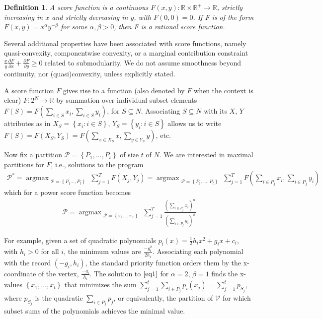 \documentclass{article}
\newtheorem{definition}{Definition}
\theoremstyle{case}
\DeclareMathOperator*{\argmax}{argmax} %
\begin{document}
\begin{definition}
A score function is a continuous $F(x, y)\colon \mathbb{R} \times \mathbb{R}^{+} \to \mathbb{R}$, strictly increasing in $x$ and strictly decreasing in $y$, with $F\left( 0,0\right) = 0$. If F is of the form $F(x,y) = x^\alpha y^{-\beta}$ for some $\alpha, \beta > 0$, then F is a rational score function. 
\end{definition}

Several additional properties have been associated with score functions, namely quasi-convexity, componentwise convexity, or a marginal contribution constraint $\frac{x}{y} \frac{\partial F}{\partial x} + \frac{\partial F}{\partial y} \geq 0$ related to submodularity. We do not assume smoothness beyond continuity, nor (quasi)convexity, unless explicitly stated.

A score function $F$ gives rise to a function (also denoted by $F$ when the context is clear) $F \colon 2^N \rightarrow \mathbb{R}$ by summation over individual subset elements $F(S) = F(\sum_{i \in S} x_i, \sum_{i \in S} y_i)$, for $S \subseteq N$. Associating $S \subseteq N$ with its $X$, $Y$ attributes as in $X_S = \left\lbrace x_i \colon i \in S\right\rbrace$, $Y_S = \left\lbrace y_i \colon i \in S\right\rbrace$ allows us to write $F(S) = F(X_S, Y_S) = F(\sum_{x \in X_S}x, \sum_{y \in Y_S}y)$, etc.

Now fix a partition $\mathcal{P} = \left\lbrace P_1, \dots, P_t\right\rbrace$ of size $t$ of $N$. We are interested in maximal partitions for $F$, i.e., solutions to the program
\begin{align} \label{eq0}
\mathcal{P}^{*} = \argmax_{\substack{\mathcal{P} = \left\lbrace P_1 \dots, P_t\right\rbrace}} {\sum\limits_{j=1}^{T}F\left( X_j, Y_j\right)} = \argmax_{\substack{\mathcal{P} = \left\lbrace P_1, \dots, P_t\right\rbrace}} {\sum\limits_{j=1}^{T}F( \sum_{i \in P_j}x_i, \sum_{i \in P_j}y_i)}
\end{align}
which for a power score function becomes
\begin{align} \label{eq1}
\mathcal{P} = \argmax_{\substack{\mathcal{P} = \left\lbrace \pi_1 \dots, \pi_T\right\rbrace}}\sum_{j=1}^{T}\frac{(\sum_{i \in P_j}x_i)^\alpha}{(\sum_{i \in P_j}y_i)^\beta}
\end{align}

\vspace{4pt}

For example, given a set of quadratic polynomials $p_i(x) = \frac{1}{2}h_ix^2 + g_ix + c_i$, with $h_i >0$ for all $i$, the minimum values are $\frac{-g_i^2}{2h_i}$. Associating each polynomial with the record $(-g_i, h_i)$, the standard priority function orders them by the x-coordinate of the vertex, $\frac{-g_i}{h_i}$. The solution to $\ref{eq1}$ for $\alpha = 2$, $\beta = 1$ finds the x-values $\left\lbrace x_1, \dots, x_t\right\rbrace$ that minimizes the sum $\sum_{j=1}^t \sum_{i \in P_j} p_i\left( x_j\right) = \sum_{j=1}^t p_{S_j}$, where $p_{S_j}$ is the quadratic $\sum_{i \in P_j} p_j$, or equivalently, the partition of $\mathcal{V}$ for which subset sums of the polynomials achieves the minimal value.
\end{document}
